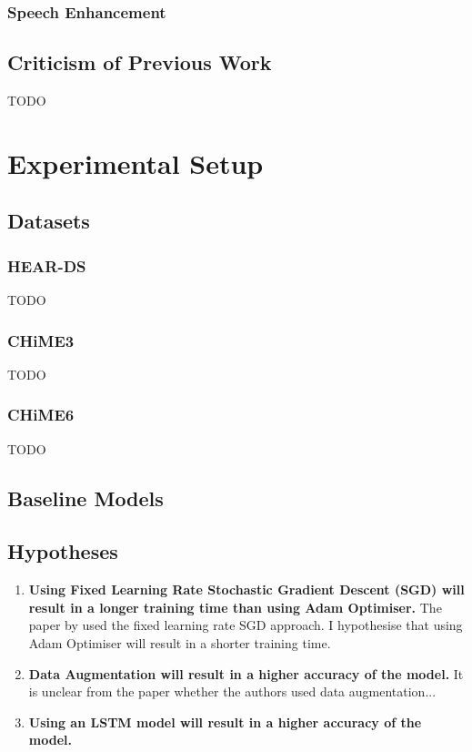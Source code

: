 \documentclass[logo,bsc,singlespacing,parskip,online]{infthesis}
\begin{document}
\subsection{Speech Enhancement}


\section{Criticism of Previous Work}
TODO

\chapter{Experimental Setup}
\section{Datasets}
\subsection{HEAR-DS}
TODO
\subsection{CHiME3}
TODO
\subsection{CHiME6}
TODO

\section{Baseline Models}

\section{Hypotheses}

\begin{enumerate}
   \item \textbf{Using Fixed Learning Rate Stochastic Gradient Descent (SGD) will result in a longer training time than using Adam Optimiser.} The paper by \citet{Huwel2020HearDS} used the fixed learning rate SGD approach.
   I hypothesise that using Adam Optimiser will result in a shorter training time.
   \item \textbf{Data Augmentation will result in a higher accuracy of the model.} It is unclear from the paper whether the authors used data augmentation...
   \item \textbf{Using an LSTM model will result in a higher accuracy of the model.}
\end{enumerate}
\end{document}
